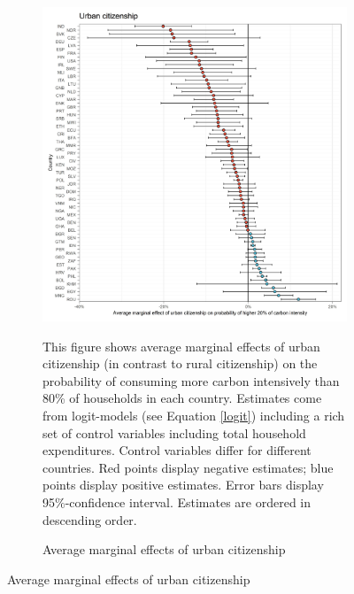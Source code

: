  \begin{figure}[ht!]\ContinuedFloat
   \centering
   \begin{subfigure}[b]{\textwidth}
   \centering
   \caption{Average marginal effects of urban citizenship} \label{fig:Logit_ME_urban}
   \includegraphics{1_Figures/Analysis_Logit_Models_Marginal_Effects/Average_Marginal_Effects_affected_upper_80_urban_01_2017.jpg}
   \begin{subcaption2}
     This figure shows average marginal effects of urban citizenship (in contrast to rural citizenship) on the probability of consuming more carbon intensively than 80\% of households in each country. Estimates come from logit-models (see Equation \ref{logit}) including a rich set of control variables including total household expenditures. Control variables differ for different countries. Red points display negative estimates; blue points display positive estimates. Error bars display 95\%-confidence interval. Estimates are ordered in descending order.
   \end{subcaption2}
   \end{subfigure}
 \end{figure}
 \clearpage

